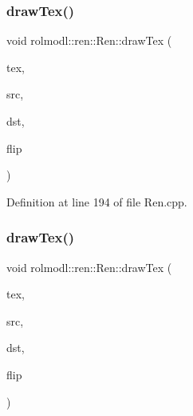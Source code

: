 \mbox{\label{classrolmodl_1_1blend_mode_1_1_ren_af317aa75b80eea557415861027509591}} 
\subsubsection{\texorpdfstring{drawTex()}{drawTex()}\hspace{0.1cm}{\footnotesize\ttfamily [26/36]}}
{\footnotesize\ttfamily void rolmodl\+::ren\+::\+Ren\+::draw\+Tex (\begin{DoxyParamCaption}\item[{Tex \&}]{tex,  }\item[{const \mbox{\hyperlink{structrolmodl_1_1blend_mode_1_1_src_rect_w_h}{Src\+Rect\+WH}}}]{src,  }\item[{const \mbox{\hyperlink{structrolmodl_1_1blend_mode_1_1_dst_rect_x_y}{Dst\+Rect\+XY}}}]{dst,  }\item[{const \mbox{\hyperlink{structrolmodl_1_1blend_mode_1_1_flip}{Flip}}}]{flip }\end{DoxyParamCaption})}



Definition at line 194 of file Ren.\+cpp.

\mbox{\label{classrolmodl_1_1blend_mode_1_1_ren_ac2725c17a9391876f9c27a38c35d9b04}} 
\subsubsection{\texorpdfstring{drawTex()}{drawTex()}\hspace{0.1cm}{\footnotesize\ttfamily [27/36]}}
{\footnotesize\ttfamily void rolmodl\+::ren\+::\+Ren\+::draw\+Tex (\begin{DoxyParamCaption}\item[{Tex \&}]{tex,  }\item[{const \mbox{\hyperlink{structrolmodl_1_1blend_mode_1_1_src_rect_x_y}{Src\+Rect\+XY}}}]{src,  }\item[{const \mbox{\hyperlink{structrolmodl_1_1blend_mode_1_1_dst_rect_w_h}{Dst\+Rect\+WH}}}]{dst,  }\item[{const \mbox{\hyperlink{structrolmodl_1_1blend_mode_1_1_flip}{Flip}}}]{flip }\end{DoxyParamCaption})}



